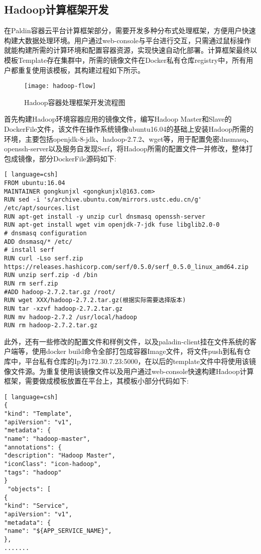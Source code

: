 \subsection{Hadoop计算框架开发}
在Paldin容器云平台计算框架部分，需要开发多种分布式处理框架，方便用户快速构建大数据处理环境。用户通过web-console与平台进行交互，只需通过鼠标操作就能构建所需的计算环境和配置容器资源，实现快速自动化部署。计算框架最终以模板Template存在集群中，所需的镜像文件在Docker私有仓库registry中，所有用户都重复使用该模板，其构建过程如下所示。
\begin{figure}[H] %
	\centering
	\texttt{[image: hadoop-flow]}
	\caption{Hadoop容器处理框架开发流程图}
\end{figure}

首先构建Hadoop环境容器应用的镜像文件，编写Hadoop Master和Slave的DockerFile文件，该文件在操作系统镜像ubuntu16.04的基础上安装Hadoop所需的环境，主要包括openjdk-8-jdk、hadoop-2.7.2、wget等，用于配置免密dnsmasq、openssh-server以及服务自发现Serf，将Hadoop所需的配置文件一并修改，整体打包成镜像，部分DockerFile源码如下:
\begin{lstlisting}[ language=csh]
FROM ubuntu:16.04
MAINTAINER gongkunjxl <gongkunjxl@163.com>
RUN sed -i 's/archive.ubuntu.com/mirrors.ustc.edu.cn/g' /etc/apt/sources.list
RUN apt-get install -y unzip curl dnsmasq openssh-server
RUN apt-get install wget vim openjdk-7-jdk fuse libglib2.0-0
# dnsmasq configuration
ADD dnsmasq/* /etc/
# install serf
RUN curl -Lso serf.zip https://releases.hashicorp.com/serf/0.5.0/serf_0.5.0_linux_amd64.zip
RUN unzip serf.zip -d /bin 
RUN rm serf.zip
#ADD hadoop-2.7.2.tar.gz /root/
RUN wget XXX/hadoop-2.7.2.tar.gz(根据实际需要选择版本)
RUN tar -xzvf hadoop-2.7.2.tar.gz
RUN mv hadoop-2.7.2 /usr/local/hadoop
RUN rm hadoop-2.7.2.tar.gz
\end{lstlisting}

此外，还有一些修改的配置文件和样例文件，以及paladin-client挂在文件系统的客户端等，使用docker build命令全部打包成容器Image文件，将文件push到私有仓库中，平台私有仓库的Ip为172.30.7.23:5000，在以后的template文件中将使用该镜像文件源。为重复使用该镜像文件以及用户通过web-console快速构建Hadoop计算框架，需要做成模板放置在平台上，其模板小部分代码如下:
\begin{lstlisting}[ language=csh]
{
"kind": "Template",
"apiVersion": "v1",
"metadata": {
"name": "hadoop-master",
"annotations": {
"description": "Hadoop Master",
"iconClass": "icon-hadoop",
"tags": "hadoop"
}
 "objects": [
{
"kind": "Service",
"apiVersion": "v1",
"metadata": {
"name": "${APP_SERVICE_NAME}",
},
.......
\end{lstlisting}


